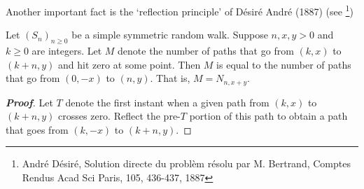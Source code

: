 Another important fact is the `reflection principle' of D\'esir\'e Andr\'e (1887) (see \footnote{Andr\'e D\'esir\'e, Solution directe du probl\`em r\'esolu par M. Bertrand, Comptes Rendus Acad Sci Paris, 105, 436-437, 1887})

\begin{theorem}\label{thm:reflection_principle_simple_symmetric_random_walk}
Let $(S_n)_{n\geq 0}$ be a simple symmetric random walk. Suppose $n,x,y>0$ and $k\geq 0$ are integers. Let $M$ denote the number of paths that go from $(k,x)$ to $(k+n,y)$ and hit zero at some point. Then $M$ is equal to the number of paths that go from $(0,-x)$ to $(n,y)$. That is, $M=N_{n,x+y}$.
\end{theorem}

\begin{proof}[\bf Proof]
Let $T$ denote the first instant when a given path from $(k,x)$ to $(k+n,y)$ crosses zero. Reflect the pre-$T$ portion of this path to obtain a path that goes from $(k,-x)$ to $(k+n,y)$.

\end{proof}
